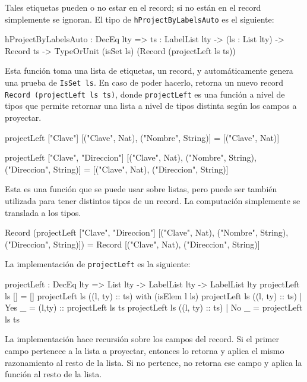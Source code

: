 Tales etiquetas pueden o no estar en el record; si no están en el record simplemente se ignoran. El tipo de \texttt{hProjectByLabelsAuto} es el siguiente:

\begin{code}
hProjectByLabelsAuto : DecEq lty => {ts : LabelList lty} ->
  (ls : List lty) -> Record ts ->
  TypeOrUnit (isSet ls) (Record (projectLeft ls ts))
\end{code}

Esta función toma una lista de etiquetas, un record, y automáticamente genera una prueba de \texttt{IsSet ls}. En caso de poder hacerlo, retorna un nuevo record \texttt{Record (projectLeft ls ts)}, donde \texttt{projectLeft} es una función a nivel de tipos que permite retornar una lista a nivel de tipos distinta según los campos a proyectar.

\begin{code}
projectLeft ["Clave"]
  [("Clave", Nat), ("Nombre", String)] =
  [("Clave", Nat)]

projectLeft ["Clave", "Direccion"]
  [("Clave", Nat), ("Nombre", String), ("Direccion", String)] =
  [("Clave", Nat), ("Direccion", String)]
\end{code}

Esta es una función que se puede usar sobre listas, pero puede ser también utilizada para tener distintos tipos de un record. La computación simplemente se translada a los tipos.

\begin{code}
Record (projectLeft ["Clave", "Direccion"]
  [("Clave", Nat), ("Nombre", String), ("Direccion", String)]) =
Record [("Clave", Nat), ("Direccion", String)]
\end{code}

La implementación de \texttt{projectLeft} es la siguiente:

\begin{code}
projectLeft : DecEq lty => List lty -> LabelList lty ->
  LabelList lty
projectLeft ls [] = []
projectLeft ls ((l, ty) :: ts) with (isElem l ls)
  projectLeft ls ((l, ty) :: ts) | Yes _ = 
    (l,ty) :: projectLeft ls ts
  projectLeft ls ((l, ty) :: ts) | No _ = projectLeft ls ts
\end{code}

La implementación hace recursión sobre los campos del record. Si el primer campo pertenece a la lista a proyectar, entonces lo retorna y aplica el mismo razonamiento al resto de la lista. Si no pertence, no retorna ese campo y aplica la función al resto de la lista.

